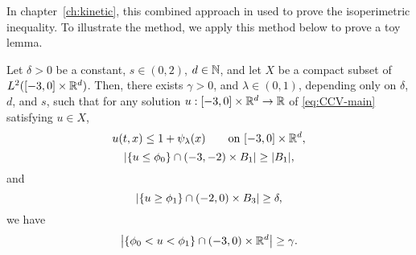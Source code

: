 In chapter~\ref{ch:kinetic}, this combined approach in used to prove the isoperimetric inequality.  To illustrate the method, we apply this method below to prove a toy lemma.  


\begin{lemma}
Let $\delta>0$ be a constant, $s \in (0,2)$, $d \in \mathbb{N}$, and let $X$ be a compact subset of $L^2([-3,0]\times\mathbb{R}^d)$.  Then, there exists $\gamma > 0$, and $\lambda \in (0,1)$, depending only on $\delta$, $d$, and $s$, such that for any solution $u:[-3,0] \times \mathbb{R}^d \to \mathbb{R}$ of \eqref{eq:CCV-main} satisfying $u \in X$, 
\[ u(t,x) \leq 1 + \psi_\lambda(x) \qquad \textrm{on } [-3,0]\times\mathbb{R}^d, \]
\[ \left\lvert \{u \leq \phi_0\} \cap (-3,-2)\times B_1 \right\rvert \geq |B_1|, \]
and
\[ \left\lvert \{u \geq \phi_1\} \cap (-2,0)\times B_3 \right\rvert \geq \delta, \]
we have
\[ \left\lvert \{\phi_0 < u < \phi_1\} \cap (-3,0)\times \mathbb{R}^d \right\rvert \geq \gamma. \]
\end{lemma}

